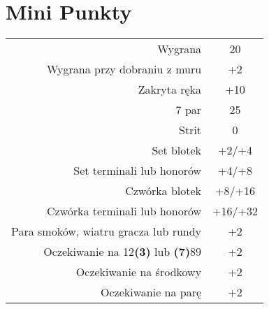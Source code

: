 \documentclass[12pt, a4paper]{article}
\begin{document}
    \section*{Mini Punkty}
    \begin{table}[h!]
        \centering
        \begin{tabular}{rc}
            Wygrana & 20 \\
            Wygrana przy dobraniu z muru & +2 \\
            Zakryta ręka & +10 \\
            7 par & 25 \\[7mm]
            Strit & 0 \\
            Set blotek & +2/+4 \\
            Set terminali lub honorów & +4/+8 \\
            Czwórka blotek & +8/+16 \\
            Czwórka terminali lub honorów & +16/+32 \\
            Para smoków, wiatru gracza lub rundy & +2 \\[7mm]
            Oczekiwanie na 12\textbf{(3)} lub \textbf{(7)}89 & +2 \\
            Oczekiwanie na środkowy & +2 \\
            Oczekiwanie na parę & +2 \\
        \end{tabular}
    \end{table}
\end{document}
